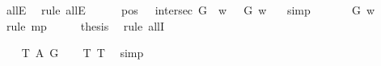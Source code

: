 \begin{isabellebody}
\ allE\ \isamarkupfalse%
\ {\isacharparenleft}rule\ allE{\isacharparenright}\isanewline
\ \ \ \ \isamarkupfalse%
\ {\isachardoublequoteopen}{\isacharparenleft}{\isacharparenleft}pos\ {\isasymP}\ \isactrlbold {\isasymand}\ intersec\ G\ {\isasymP}{\isacharparenright}\ w{\isacharparenright}\ {\isasymlongrightarrow}\ {\isasymP}\ G\ w{\isachardoublequoteclose}\ \ \isamarkupfalse%
\ simp\isanewline
\ \ \ \ \isamarkupfalse%
\ {\isachardoublequoteopen}{\isasymP}\ G\ w{\isachardoublequoteclose}\ \isamarkupfalse%
\ {}\ \isamarkupfalse%
\ {\isacharparenleft}rule\ mp{\isacharparenright}\isanewline
\ \ \isacommand{{\isacharbraceright}}\isamarkupfalse%
\ \isamarkupfalse%
\ {\isacharquery}thesis\ \isamarkupfalse%
\ {\isacharparenleft}rule\ allI{\isacharparenright}\isanewline
\ \ \isamarkupfalse%
%
%
%
%
\begin{isamarkuptext}%
%
\end{isamarkuptext}\isamarkuptrue%
\ \ \isamarkupfalse%
\ T{}{\isacharcolon}\ {\isachardoublequoteopen}{\isasymlfloor}\isactrlbold {\isasymdiamond}\isactrlbold {\isasymexists}\isactrlsup A\ G{\isasymrfloor}{\isachardoublequoteclose}%
\ \ %
%
\isamarkupfalse%
\ T{}\ T{}\ \isamarkupfalse%
\ simp%
%
%
%

\end{isabellebody}
